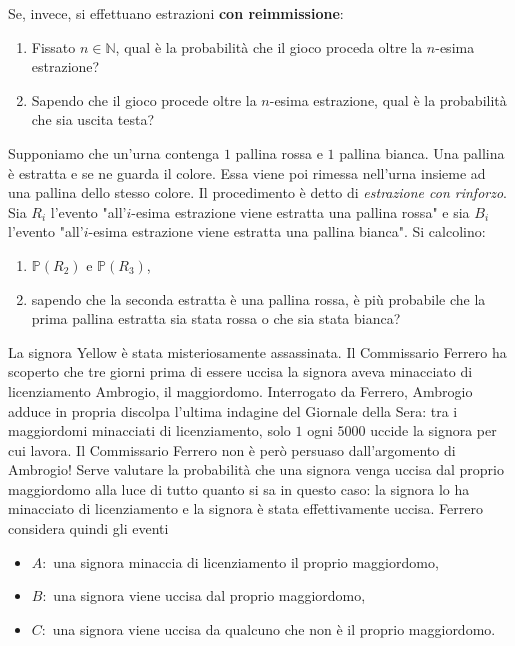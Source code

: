 Se, invece, si effettuano estrazioni \textbf{con reimmissione}:
\begin{enumerate}
\item Fissato $n\in \mathbb{N}$, qual è la probabilità che il gioco proceda oltre la $n$-esima estrazione?
\item Sapendo che il gioco procede oltre la $n$-esima estrazione, qual è la probabilità che sia uscita testa?
\end{enumerate}

Supponiamo che un'urna contenga $1$ pallina rossa e $1$ pallina bianca. Una pallina è estratta e se ne guarda il colore. Essa viene poi rimessa nell'urna insieme ad una pallina dello stesso colore. Il procedimento è detto di \textit{estrazione con rinforzo}. Sia $R_{i}$ l'evento "all'$i$-esima estrazione viene estratta una pallina rossa" e sia $B_{i}$ l'evento "all'$i$-esima estrazione viene estratta una pallina bianca". Si calcolino:
\begin{enumerate}
\item $\mathbb{P}( R_{2})$ e $\mathbb{P}( R_{3})$,
\item sapendo che la seconda estratta è una pallina rossa, è più probabile che la prima pallina estratta sia stata rossa o che sia stata bianca?
\end{enumerate}

La signora Yellow è stata misteriosamente assassinata. Il Commissario Ferrero ha scoperto che tre giorni prima di essere uccisa la signora aveva minacciato di licenziamento Ambrogio, il maggiordomo. Interrogato da Ferrero, Ambrogio adduce in propria discolpa l'ultima indagine del Giornale della Sera: tra i maggiordomi minacciati di licenziamento, solo $1$ ogni $5000$ uccide la signora per cui lavora. Il Commissario Ferrero non è però persuaso dall'argomento di Ambrogio! Serve valutare la probabilità che una signora venga uccisa dal proprio maggiordomo alla luce di tutto quanto si sa in questo caso: la signora lo ha minacciato di licenziamento e la signora è stata effettivamente uccisa. Ferrero considera quindi gli eventi
\begin{itemize}
\item $A:$ una signora minaccia di licenziamento il proprio maggiordomo,
\item $B:$ una signora viene uccisa dal proprio maggiordomo,
\item $C:$ una signora viene uccisa da qualcuno che non è il proprio maggiordomo.
\end{itemize}

